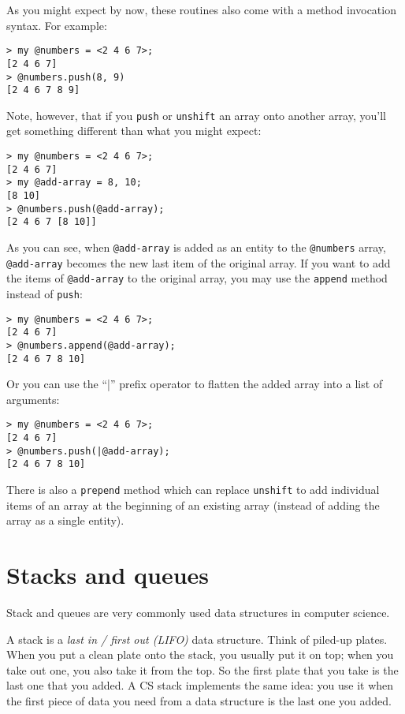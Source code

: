 As you might expect by now, these routines also come with a 
method invocation syntax. For example:

\begin{verbatim}
> my @numbers = <2 4 6 7>;
[2 4 6 7]
> @numbers.push(8, 9)
[2 4 6 7 8 9]
\end{verbatim}

Note, however, that if you {\tt push} or {\tt unshift} an 
array onto another array, you'll get something different 
than what you might expect:

\begin{verbatim}
> my @numbers = <2 4 6 7>;
[2 4 6 7]
> my @add-array = 8, 10;
[8 10]
> @numbers.push(@add-array);
[2 4 6 7 [8 10]]
\end{verbatim}

As you can see, when \verb'@add-array' is added as an entity 
to the \verb'@numbers' array, \verb'@add-array' becomes 
the new last item of the original array. If you want to 
add the items of \verb'@add-array' to the original array, 
you may use the {\tt append} method instead of {\tt push}:

\begin{verbatim}
> my @numbers = <2 4 6 7>;
[2 4 6 7]
> @numbers.append(@add-array);
[2 4 6 7 8 10]
\end{verbatim}

Or you can use the ``|'' prefix operator to flatten the 
added array into a list of arguments:

\begin{verbatim}
> my @numbers = <2 4 6 7>;
[2 4 6 7]
> @numbers.push(|@add-array);
[2 4 6 7 8 10]
\end{verbatim}

There is also a {\tt prepend} method which can replace 
{\tt unshift} to add individual items of an array at the 
beginning of an existing array (instead of adding the array 
as a single entity).


\section{Stacks and queues}
\label{stacks_queues}

Stack and queues are very commonly used data structures in 
computer science.

A stack is a \emph{last in / first out (LIFO)} data structure. Think of 
piled-up plates. When you put a clean plate onto the stack, 
you usually put it on top; when you take out one, you also 
take it from the top. So the first plate that you take 
is the last one that you added. A CS stack implements the same 
idea: you use it when the first piece of data you need from a 
data structure is the last one you added.

